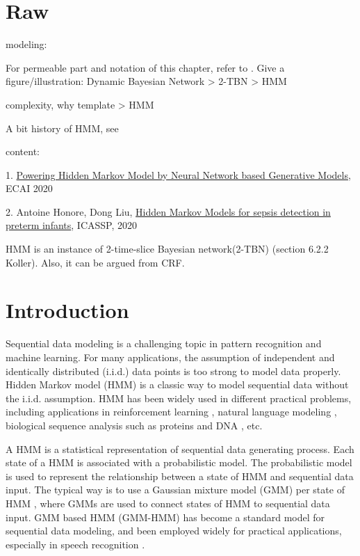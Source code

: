 \section{Raw}


modeling:

For permeable part and notation of this chapter, refer to \cite[Chapter~6.2]{koller2009pgm}.
Give a figure/illustration: Dynamic Bayesian Network > 2-TBN > HMM


complexity, why template > HMM


A bit history of HMM, see \cite[Chapter~6.8]{koller2009pgm}

content:

1. \href{https://arxiv.org/abs/1910.05744}{Powering Hidden Markov Model by Neural Network based Generative Models}, ECAI 2020

2. Antoine Honore, Dong Liu, \href{https://arxiv.org/pdf/1910.13904.pdf}{Hidden Markov Models for sepsis detection in preterm infants}, ICASSP, 2020

HMM is an instance of 2-time-slice Bayesian network(2-TBN) (section 6.2.2 Koller). Also, it can be argued from CRF.

\section{Introduction}
Sequential data modeling is a challenging topic in pattern recognition and machine learning. For many applications, the assumption of independent and identically distributed (i.i.d.) data points is too strong to model data properly. Hidden Markov model (HMM) is a classic way to model sequential data without the i.i.d. assumption. HMM has been widely used in different practical problems, including applications in reinforcement learning \cite{ding2018reinforcementhmm,levine2018reinforcementReview}, natural language modeling \cite{khan2016survey,Hariyanti_2019}, biological sequence analysis such as proteins \cite{ASHWIN20172} and DNA \cite{ren2015dna}, etc.

A HMM is a statistical representation of sequential data generating process.
Each state of a HMM is associated with a probabilistic model.
The probabilistic model is used to represent the relationship between a state of HMM and sequential data input. The typical way is to use a Gaussian mixture model (GMM) per state of HMM \cite{juang1986maximum}, where GMMs are used to connect states of HMM to sequential data input. GMM based HMM (GMM-HMM) has become a standard model for sequential data modeling, and been employed widely for practical applications, especially in speech recognition \cite{gales2008application,chatterjee2011auditory}.

